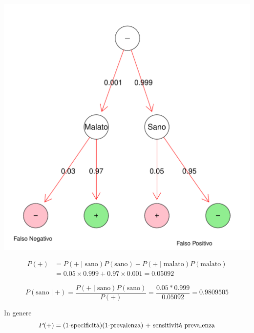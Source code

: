 \documentclass[onecolumn,12pt]{book}\usepackage[]{graphicx}\usepackage[]{color}
\makeatletter
\def\maxwidth{ %
  \ifdim\Gin@nat@width>\linewidth
    \linewidth
  \else
    \Gin@nat@width
  \fi
}
\newenvironment{knitrout}{}{} %
\makeatother
\begin{document}
\begin{knitrout}
\color{fgcolor}
\includegraphics[width=\maxwidth]{figure/unnamed-chunk-23-1} 

\end{knitrout}

\begin{align*}P(+) &= P(+ \mid  \textrm{sano})P(\textrm{sano}) + P( + \mid \textrm{malato})P(\textrm{malato}) \\
&=0.05\times 0.999 + 0.97\times  0.001=0.05092
\end{align*}
 

$$ P(\textrm{sano} \mid   +) = \dfrac{P( +\mid  \textrm{sano}) P(\textrm{sano})}{P(+)}=\dfrac{0.05*0.999}{0.05092}=0.9809505$$


 


In genere
$$P(+) = \hbox{(1-specificità)(1-prevalenza) + sensitività prevalenza}$$
\end{document}
